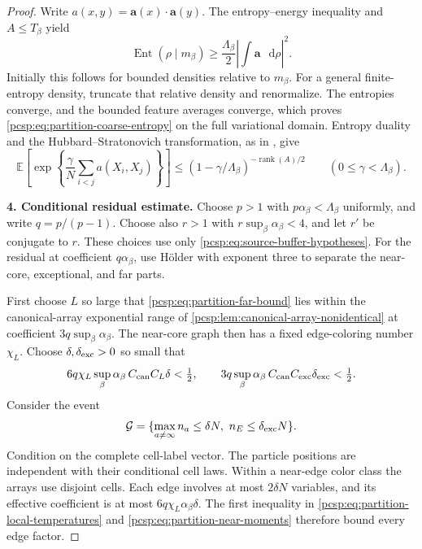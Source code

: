 \documentclass[11pt,reqno]{amsart}
\numberwithin{equation}{section}
\theoremstyle{plain}
\theoremstyle{definition}
\newcommand{\dd}{\mathop{}\!\mathrm d}
\newcommand{\E}{\mathbb E}
\newcommand{\be}{\beta}
\newcommand{\Ent}{\operatorname{Ent}}
\newcommand{\step}[1]{\par\medskip\noindent\textbf{#1}}
\begin{document}
\begin{proof}
Write $a(x,y)=\mathbf a(x)\cdot\mathbf a(y)$. The entropy--energy inequality and $A\leq T_\be$ yield
\begin{equation}\label{pcsp:eq:partition-coarse-entropy}
 \Ent(\rho\mid m_\be)
 \geq \frac{\Lambda_\be}{2}
       \left|\int\mathbf a\,\dd\rho\right|^2.
\end{equation}
Initially this follows for bounded densities relative to $m_\be$. For a general finite-entropy density, truncate that relative density and renormalize. The entropies converge, and the bounded feature averages converge, which proves \eqref{pcsp:eq:partition-coarse-entropy} on the full variational domain. Entropy duality and the Hubbard--Stratonovich transformation, as in , give
\begin{equation}\label{pcsp:eq:partition-coarse-bound}
 \E\left[\exp\left\{\frac\gamma N\sum_{i<j}a(X_i,X_j)\right\}\right]
 \leq(1-\gamma/\Lambda_\be)^{-\operatorname{rank}(A)/2}
 \qquad(0\leq\gamma<\Lambda_\be).
\end{equation}

\step{4. Conditional residual estimate.}
Choose $p>1$ with $p\alpha_\be<\Lambda_\be$ uniformly, and write $q=p/(p-1)$. Choose also $r>1$ with $r\sup_\be\alpha_\be<4$, and let $r'$ be conjugate to $r$. These choices use only \eqref{pcsp:eq:source-buffer-hypotheses}. For the residual at coefficient $q\alpha_\be$, use H\"older with exponent three to separate the near-core, exceptional, and far parts.

First choose $L$ so large that \eqref{pcsp:eq:partition-far-bound} lies within the canonical-array exponential range of \cref{pcsp:lem:canonical-array-nonidentical} at coefficient $3q\sup_\be\alpha_\be$. The near-core graph then has a fixed edge-coloring number $\chi_L$. Choose $\delta,\delta_{\rm exc}>0$ so small that
\begin{equation}\label{pcsp:eq:partition-local-temperatures}
 6q\chi_L\sup_\be\alpha_\be\, C_{\rm can}C_L\delta<\tfrac12,
 \qquad
 3q\sup_\be\alpha_\be\, C_{\rm can}C_{\rm exc}\delta_{\rm exc}<\tfrac12.
\end{equation}
Consider the event
\begin{equation}\label{pcsp:eq:partition-good-event}
 \mathcal G=\{\max_{a\ne\infty}n_a\leq\delta N,
                     \ n_E\leq\delta_{\rm exc}N\}.
\end{equation}
Condition on the complete cell-label vector. The particle positions are independent with their conditional cell laws. Within a near-edge color class the arrays use disjoint cells. Each edge involves at most $2\delta N$ variables, and its effective coefficient is at most $6q\chi_L\alpha_\be\delta$. The first inequality in \eqref{pcsp:eq:partition-local-temperatures} and \eqref{pcsp:eq:partition-near-moments} therefore bound every edge factor.


\end{proof}
\end{document}
